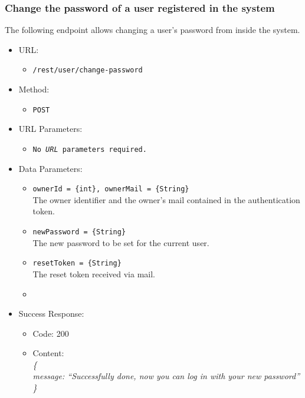 \newpage
\subsubsection*{Change the password of a user registered in the system}

The following endpoint allows changing a user's password from inside the system.

\begin{itemize}

    \item URL:
    \begin{itemize}
        \item \texttt{/rest/user/change-password}
    \end{itemize}

    \item Method:
    \begin{itemize}
        \item \texttt{POST}
    \end{itemize}

    \item URL Parameters:
    \begin{itemize}
        \item \texttt{No \textit{URL} parameters required.}
    \end{itemize}

    \item Data Parameters:
    \begin{itemize}
        \item \texttt{ownerId = \{int\}, ownerMail = \{String\}} \\
        The owner identifier and the owner's mail contained in the authentication token.
        \item \texttt{newPassword = \{String\}} \\
        The new password to be set for the current user.
        \item \texttt{resetToken = \{String\}} \\
        The reset token received via mail.
        \item
    \end{itemize}

    \item Success Response:
    \begin{itemize}
        \item Code: 200
        \item Content: \\
        \textit{
\{ \\
    message: “Successfully done, now you can log in with your new password” \\
\}
    }
    \end{itemize}


\end{itemize}
